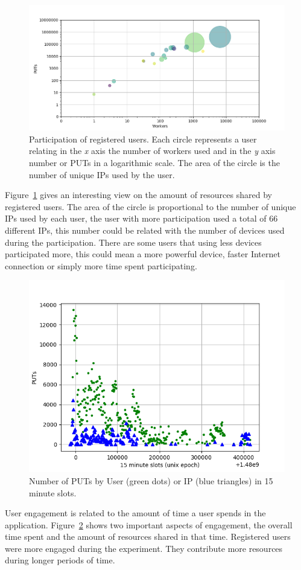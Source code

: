\documentclass{llncs}
\begin{document}
%
\begin{figure}[htb]
    \centering
        \includegraphics[width=5.3in]{img/workers_put_ip.png}
    \caption{ Participation of registered users. Each circle represents a user relating
        in the \emph{x} axis the number of workers used and in the \emph{y} axis
        number or PUTs in a logarithmic scale. The area of the circle is the number
        of unique IPs used by the user.
    }
    \label{fig:worker-put-ips}
\end{figure}
%
Figure~\ref{fig:worker-put-ips} gives an interesting view on the amount of
resources shared by registered users. The area of the circle is proportional
to the number of unique IPs used by each user, the user with more participation
used a total of 66 different IPs, this number could be related with the number
of devices used during the participation. There are some users that using less
devices participated more, this could mean a more powerful device, faster
Internet connection or simply more time spent participating.

\begin{figure}[htb]
    \centering
        \includegraphics[width=5.3in]{img/puts_by_time.png}
    \caption{Number of PUTs by User (green dots) or IP (blue triangles) in 15 minute slots.
    }
    \label{fig:puts-time}
\end{figure}
%
User engagement is related to the amount of time a user spends in the
application. Figure~\ref{fig:puts-time} shows two important aspects of
engagement, the overall time spent and the amount of resources shared
in that time. Registered users were more engaged during the experiment.
They contribute more resources during longer periods of time.
\end{document}
